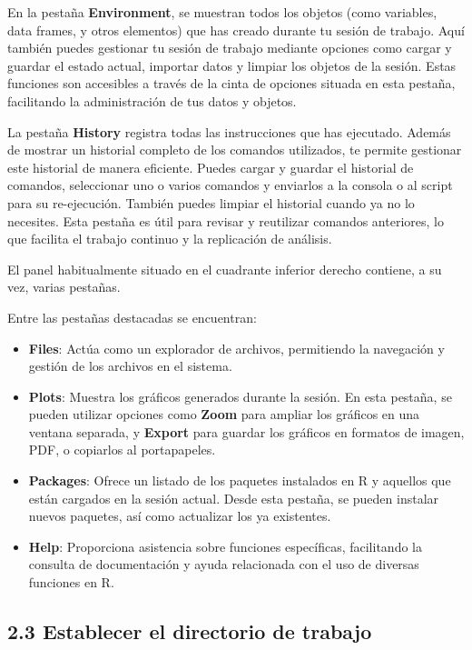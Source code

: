 \documentclass[
  letterpaper,
  DIV=11,
  numbers=noendperiod]{scrreprt}
\begin{document}
En la pestaña \textbf{Environment}, se muestran todos los objetos (como
variables, data frames, y otros elementos) que has creado durante tu
sesión de trabajo. Aquí también puedes gestionar tu sesión de trabajo
mediante opciones como cargar y guardar el estado actual, importar datos
y limpiar los objetos de la sesión. Estas funciones son accesibles a
través de la cinta de opciones situada en esta pestaña, facilitando la
administración de tus datos y objetos.

La pestaña \textbf{History} registra todas las instrucciones que has
ejecutado. Además de mostrar un historial completo de los comandos
utilizados, te permite gestionar este historial de manera eficiente.
Puedes cargar y guardar el historial de comandos, seleccionar uno o
varios comandos y enviarlos a la consola o al script para su
re-ejecución. También puedes limpiar el historial cuando ya no lo
necesites. Esta pestaña es útil para revisar y reutilizar comandos
anteriores, lo que facilita el trabajo continuo y la replicación de
análisis.

El panel habitualmente situado en el cuadrante inferior derecho
contiene, a su vez, varias pestañas.

Entre las pestañas destacadas se encuentran:

\begin{itemize}
\item
  \textbf{Files}: Actúa como un explorador de archivos, permitiendo la
  navegación y gestión de los archivos en el sistema.
\item
  \textbf{Plots}: Muestra los gráficos generados durante la sesión. En
  esta pestaña, se pueden utilizar opciones como \textbf{Zoom} para
  ampliar los gráficos en una ventana separada, y \textbf{Export} para
  guardar los gráficos en formatos de imagen, PDF, o copiarlos al
  portapapeles.
\item
  \textbf{Packages}: Ofrece un listado de los paquetes instalados en R y
  aquellos que están cargados en la sesión actual. Desde esta pestaña,
  se pueden instalar nuevos paquetes, así como actualizar los ya
  existentes.
\item
  \textbf{Help}: Proporciona asistencia sobre funciones específicas,
  facilitando la consulta de documentación y ayuda relacionada con el
  uso de diversas funciones en R.
\end{itemize}

\hypertarget{establecer-el-directorio-de-trabajo}{%
\subsection{2.3 Establecer el directorio de
trabajo}\label{establecer-el-directorio-de-trabajo}}
\end{document}
